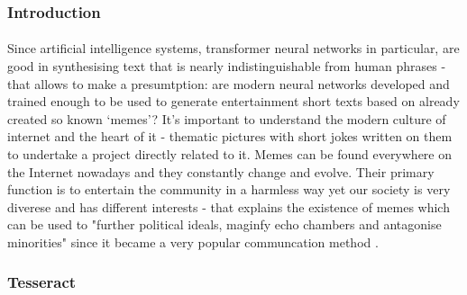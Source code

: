 \documentclass[12pt]{report}
\begin{document}
    \subsubsection*{Introduction}
    \paragraph{}

    Since artificial intelligence systems, transformer neural networks in particular, are good in synthesising text that is nearly indistinguishable from human phrases - that allows to make a presumtption: are modern neural networks developed and trained enough to be used to generate
    entertainment short texts based on already created so known `memes'? It's important to understand the modern culture of internet and the heart of it - thematic pictures with short jokes written on them to undertake a project directly related to it.
    Memes can be found everywhere on the Internet nowadays and they constantly change and evolve. Their primary function is to entertain the community in a harmless way yet our society is very diverese and has different interests - that explains the existence of memes which can be used
    to "further political ideals, maginfy echo chambers and antagonise minorities" since it became a very popular communcation method \citep{dank_learning}. 




    \subsubsection{Tesseract}
\end{document}
